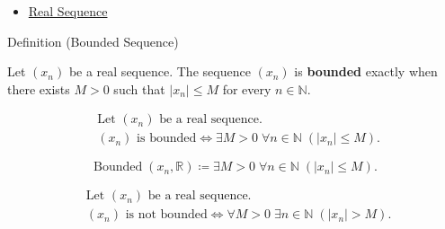 \begin{dependencies}
\begin{itemize}
  \item \hyperref[def:real-sequence]{Real Sequence}
\end{itemize}
\end{dependencies}


\begin{definitionbox}{Definition (Bounded Sequence)}
\begin{definition}
\label{def:bounded-sequence}
Let $(x_n)$ be a real sequence. The sequence $(x_n)$ is
\textbf{bounded} exactly when there exists $M > 0$ such that
$|x_n| \le M$ for every $n \in \mathbb{N}$.
\end{definition}
\end{definitionbox}

\begin{remark*}
\[
\begin{aligned}
&\text{Let } (x_n) \text{ be a real sequence.}\\
&(x_n) \text{ is bounded}
\Longleftrightarrow
\exists M > 0\;
\forall n \in \mathbb{N}\;(|x_n| \le M).
\end{aligned}
\]
\end{remark*}

\begin{remark*}
\[
\operatorname{Bounded}(x_n,\mathbb{R})
\coloneqq
\exists M > 0\;
\forall n \in \mathbb{N}\;(|x_n| \le M).
\]
\end{remark*}

\begin{remark*}
\[
\begin{aligned}
&\text{Let } (x_n) \text{ be a real sequence.}\\
&(x_n) \text{ is not bounded}
\Longleftrightarrow
\forall M > 0\;
\exists n \in \mathbb{N}\;(|x_n| > M).
\end{aligned}
\]
\end{remark*}

